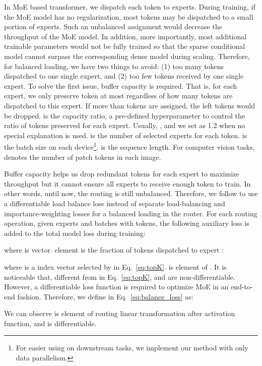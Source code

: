 \documentclass[letterpaper]{article} \usepackage{aaai22}  \usepackage{times}  \usepackage{helvet}  \usepackage{courier}  \usepackage[hyphens]{url}  \usepackage{graphicx} \urlstyle{rm} \def\UrlFont{\rm}  \usepackage{natbib}  \usepackage{caption} \DeclareCaptionStyle{ruled}{labelfont=normalfont,labelsep=colon,strut=off} \frenchspacing  \setlength{\pdfpagewidth}{8.5in}  \setlength{\pdfpageheight}{11in}  \usepackage{algorithm}
\begin{document}
In MoE based transformer, we dispatch each token to  experts. During training, if the MoE model has no regularization, most tokens may be dispatched to a small portion of experts. Such an unbalanced assignment would decrease the throughput of the MoE model. In addition, more importantly, most additional trainable parameters would not be fully trained so that the sparse conditional model cannot surpass the corresponding dense model during scaling. Therefore, for balanced loading, we have two things to avoid: (1) too many tokens dispatched to one single expert, and (2) too few tokens received by one single expert. To solve the first issue, buffer capacity  is required. That is, for each expert, we only preserve  token at most regardless of how many tokens are dispatched to this expert. If more than  tokens are assigned, the left tokens would be dropped.  is the capacity ratio, a pre-defined hyperparameter to control the ratio of tokens preserved for each expert. Usually, , and we set  as 1.2 when no special explanation is used.  is the number of selected experts for each token.  is the batch size on each device\footnote{For easier using on downstream tasks, we implement our method with only data parallelism.}.  is the sequence length. For computer vision tasks,  denotes the number of patch tokens in each image. 

Buffer capacity  helps us drop redundant tokens for each expert to maximize throughput but it cannot ensure all experts to receive enough token to train. In other words, until now, the routing is still unbalanced. Therefore, we follow \citet{fedus2021switch} to use a differentiable load balance loss instead of separate load-balancing and importance-weighting losses for a balanced loading in the router. For each routing operation, given  experts and  batches with  tokens, the following auxiliary loss is added to the total model loss during training: 




where  is vector.  element is the fraction of tokens dispatched to expert :


where  is a index vector selected by  in Eq.~\ref{eq:topK}.  is  element of . It is noticeable that, different from  in Eq.~\ref{eq:topK},  and  are non-differentiable. However, a differentiable loss function is required to optimize MoE in an end-to-end fashion. Therefore, we define  in Eq.~\ref{eq:balance_loss} as:



We can observe  is  element of routing linear transformation after  activation function, and  is differentiable. 
\end{document}
